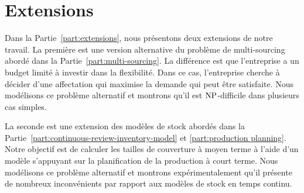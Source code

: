 \section{Extensions}


Dans la Partie~\ref{part:extensions}, nous présentons deux extensions de notre travail.
La première est une version alternative du problème de multi-sourcing abordé dans la Partie~\ref{part:multi-sourcing}.
La différence est que l'entreprise a un budget limité à investir dans la flexibilité.
Dans ce cas, l'entreprise cherche à décider d'une affectation qui maximise la demande qui peut être satisfaite.
Nous modélisons ce problème alternatif et montrons qu'il est $\operatorname{NP}$-difficile dans plusieurs cas simples.


La seconde est une extension des modèles de stock abordés dans la Partie~\ref{part:continuous-review-inventory-model} et \ref{part:production planning}.
Notre objectif est de calculer les tailles de couverture à moyen terme à l'aide d'un modèle s'appuyant sur la planification de la production à court terme.
Nous modélisons ce problème alternatif et montrons expérimentalement qu'il présente de nombreux inconvénients par rapport aux modèles de stock en temps continu.